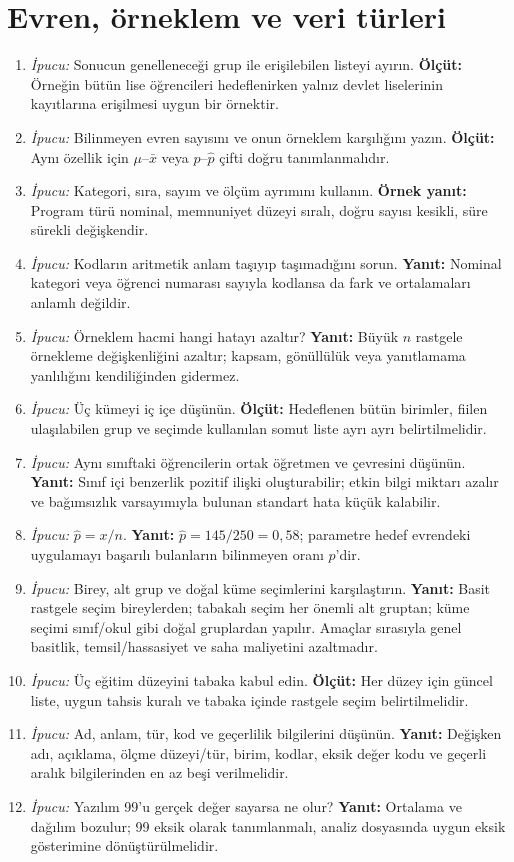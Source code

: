 \section{Evren, örneklem ve veri türleri}

\begin{enumerate}[leftmargin=*,itemsep=5pt]
\item \emph{İpucu:} Sonucun genelleneceği grup ile erişilebilen listeyi ayırın.
\textbf{Ölçüt:} Örneğin bütün lise öğrencileri hedeflenirken yalnız devlet
liselerinin kayıtlarına erişilmesi uygun bir örnektir.
\item \emph{İpucu:} Bilinmeyen evren sayısını ve onun örneklem karşılığını yazın.
\textbf{Ölçüt:} Aynı özellik için $\mu$--$\bar x$ veya $p$--$\hat p$ çifti
doğru tanımlanmalıdır.
\item \emph{İpucu:} Kategori, sıra, sayım ve ölçüm ayrımını kullanın.
\textbf{Örnek yanıt:} Program türü nominal, memnuniyet düzeyi sıralı, doğru
sayısı kesikli, süre sürekli değişkendir.
\item \emph{İpucu:} Kodların aritmetik anlam taşıyıp taşımadığını sorun.
\textbf{Yanıt:} Nominal kategori veya öğrenci numarası sayıyla kodlansa da
fark ve ortalamaları anlamlı değildir.
\item \emph{İpucu:} Örneklem hacmi hangi hatayı azaltır?
\textbf{Yanıt:} Büyük $n$ rastgele örnekleme değişkenliğini azaltır; kapsam,
gönüllülük veya yanıtlamama yanlılığını kendiliğinden gidermez.
\item \emph{İpucu:} Üç kümeyi iç içe düşünün.
\textbf{Ölçüt:} Hedeflenen bütün birimler, fiilen ulaşılabilen grup ve seçimde
kullanılan somut liste ayrı ayrı belirtilmelidir.
\item \emph{İpucu:} Aynı sınıftaki öğrencilerin ortak öğretmen ve çevresini düşünün.
\textbf{Yanıt:} Sınıf içi benzerlik pozitif ilişki oluşturabilir; etkin bilgi
miktarı azalır ve bağımsızlık varsayımıyla bulunan standart hata küçük kalabilir.
\item \emph{İpucu:} $\hat p=x/n$. \textbf{Yanıt:} $\hat p=145/250=0{,}58$;
parametre hedef evrendeki uygulamayı başarılı bulanların bilinmeyen oranı $p$'dir.
\item \emph{İpucu:} Birey, alt grup ve doğal küme seçimlerini karşılaştırın.
\textbf{Yanıt:} Basit rastgele seçim bireylerden; tabakalı seçim her önemli alt
gruptan; küme seçimi sınıf/okul gibi doğal gruplardan yapılır. Amaçlar sırasıyla
genel basitlik, temsil/hassasiyet ve saha maliyetini azaltmadır.
\item \emph{İpucu:} Üç eğitim düzeyini tabaka kabul edin.
\textbf{Ölçüt:} Her düzey için güncel liste, uygun tahsis kuralı ve tabaka
içinde rastgele seçim belirtilmelidir.
\item \emph{İpucu:} Ad, anlam, tür, kod ve geçerlilik bilgilerini düşünün.
\textbf{Yanıt:} Değişken adı, açıklama, ölçme düzeyi/tür, birim, kodlar,
eksik değer kodu ve geçerli aralık bilgilerinden en az beşi verilmelidir.
\item \emph{İpucu:} Yazılım 99'u gerçek değer sayarsa ne olur?
\textbf{Yanıt:} Ortalama ve dağılım bozulur; 99 eksik olarak tanımlanmalı,
analiz dosyasında uygun eksik gösterimine dönüştürülmelidir.
\end{enumerate}

